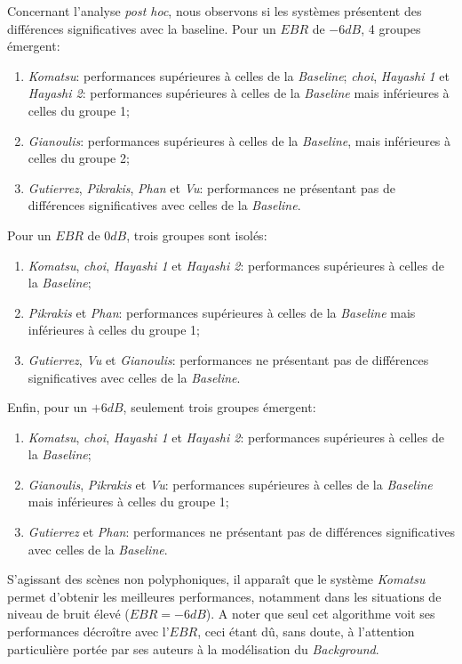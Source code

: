 Concernant l'analyse \emph{post hoc}, nous observons si les systèmes présentent des différences significatives avec la baseline. Pour un $EBR$ de $-6dB$, 4 groupes émergent:

\begin{enumerate}
\item \emph{Komatsu}: performances supérieures à celles de la \emph{Baseline};
\emph{choi}, \emph{Hayashi 1} et \emph{Hayashi 2}: performances supérieures à celles de la \emph{Baseline} mais inférieures à celles du groupe 1;
\item \emph{Gianoulis}: performances supérieures à celles de la \emph{Baseline}, mais inférieures à celles du groupe 2;
\item \emph{Gutierrez}, \emph{Pikrakis}, \emph{Phan} et \emph{Vu}: performances ne présentant pas de différences significatives avec celles de la \emph{Baseline}.
\end{enumerate}

Pour un $EBR$ de $0dB$, trois groupes sont isolés: 

\begin{enumerate}
\item \emph{Komatsu}, \emph{choi}, \emph{Hayashi 1} et \emph{Hayashi 2}: performances supérieures à celles de la \emph{Baseline};
\item \emph{Pikrakis} et \emph{Phan}: performances supérieures à celles de la \emph{Baseline} mais inférieures à celles du groupe 1;
\item \emph{Gutierrez}, \emph{Vu} et \emph{Gianoulis}: performances ne présentant pas de différences significatives avec celles de la \emph{Baseline}.
\end{enumerate}

Enfin, pour un $+6dB$, seulement trois groupes émergent:

\begin{enumerate}
\item \emph{Komatsu}, \emph{choi}, \emph{Hayashi 1} et \emph{Hayashi 2}: performances supérieures à celles de la \emph{Baseline};
\item \emph{Gianoulis}, \emph{Pikrakis} et \emph{Vu}: performances supérieures à celles de la \emph{Baseline} mais inférieures à celles du groupe 1;
\item \emph{Gutierrez} et \emph{Phan}: performances ne présentant pas de différences significatives avec celles de la \emph{Baseline}.
\end{enumerate}

S'agissant des scènes non polyphoniques, il apparaît que le système \emph{Komatsu} permet d'obtenir les meilleures performances, notamment dans les situations de niveau de bruit élevé ($EBR=-6dB$). A noter que seul cet algorithme voit ses performances décroître avec l'$EBR$, ceci étant dû, sans doute, à l'attention particulière portée par ses auteurs à la modélisation du \emph{Background}.

